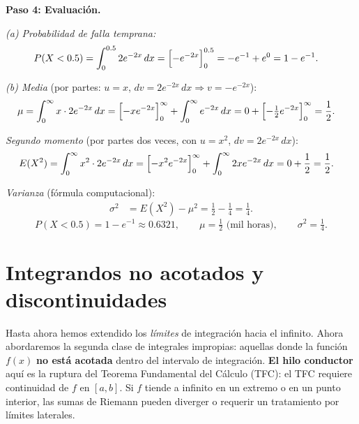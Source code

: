 \begin{example}
\begin{myproof}
\textbf{Paso 4: Evaluación.}

\textit{(a) Probabilidad de falla temprana:}
\begin{align*}
P(X<0.5) &= \int_0^{0.5} 2e^{-2x}\,dx
           = \Bigl[-e^{-2x}\Bigr]_0^{0.5}
           = -e^{-1}+e^{0} = 1-e^{-1}.
\end{align*}

\textit{(b) Media} (por partes: $u=x$, $dv=2e^{-2x}\,dx \Rightarrow v=-e^{-2x}$):
\begin{align*}
\mu &= \int_0^{\infty} x\cdot 2e^{-2x}\,dx
     = \Bigl[-xe^{-2x}\Bigr]_0^{\infty}+\int_0^\infty e^{-2x}\,dx
     = 0 + \Bigl[-\tfrac{1}{2}e^{-2x}\Bigr]_0^\infty = \frac{1}{2}.
\end{align*}

\textit{Segundo momento} (por partes dos veces, con $u=x^2$, $dv=2e^{-2x}\,dx$):
\begin{align*}
E(X^2)
  &= \int_0^\infty x^2\cdot 2e^{-2x}\,dx
   = \Bigl[-x^2 e^{-2x}\Bigr]_0^\infty + \int_0^\infty 2xe^{-2x}\,dx
   = 0 + \frac{1}{2} = \frac{1}{2}.
\end{align*}

\textit{Varianza} (fórmula computacional):
\begin{align*}
\sigma^2 &= E(X^2)-\mu^2 = \frac{1}{2}-\frac{1}{4} = \frac{1}{4}.
\end{align*}
\[
  \boxed{P(X<0.5)=1-e^{-1}\approx 0.6321,\qquad
         \mu=\tfrac{1}{2}\text{ (mil horas)},\qquad
         \sigma^2=\tfrac{1}{4}.}
\]
\end{myproof}
\end{example}

\section{Integrandos no acotados y discontinuidades}

Hasta ahora hemos extendido los \emph{límites} de integración hacia el infinito. Ahora abordaremos
la segunda clase de integrales impropias: aquellas donde la función $f(x)$ \textbf{no está acotada}
dentro del intervalo de integración. \textbf{El hilo conductor} aquí es la ruptura del Teorema
Fundamental del Cálculo (TFC): el TFC requiere continuidad de $f$ en $[a,b]$. Si $f$ tiende a
infinito en un extremo o en un punto interior, las sumas de Riemann pueden diverger o requerir un
tratamiento por límites laterales.

